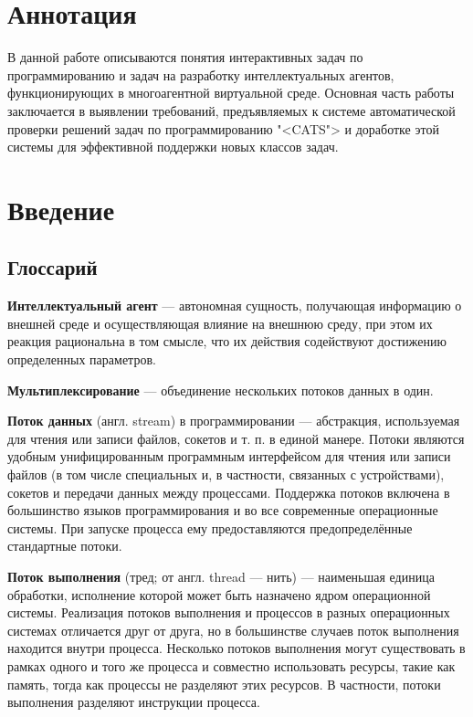 \documentclass{imcs}
\begin{document}
\setcounter{page}{2}
\setcounter{tocdepth}{2}
\tableofcontents
\pagebreak

\section*{Аннотация}
В данной работе описываются понятия интерактивных задач по программированию и задач на разработку интеллектуальных агентов, функционирующих в многоагентной виртуальной среде. Основная часть работы заключается в выявлении требований, предъявляемых к системе автоматической проверки решений задач по программированию "<CATS"> и доработке этой системы для эффективной поддержки новых классов задач.

\pagebreak

\section{Введение}
\subsection{Глоссарий}
\textbf{Интеллектуальный агент} — автономная сущность, получающая информацию о внешней среде и осуществляющая влияние на внешнюю среду, при этом их реакция рациональна в том смысле, что их действия содействуют достижению определенных параметров.

\textbf{Мультиплексирование} — объединение нескольких потоков данных в один.

\textbf{Поток данных} (англ. stream) в программировании — абстракция, используемая для чтения или записи файлов, сокетов и т. п. в единой манере. Потоки являются удобным унифицированным программным интерфейсом для чтения или записи файлов (в том числе специальных и, в частности, связанных с устройствами), сокетов и передачи данных между процессами. Поддержка потоков включена в большинство языков программирования и во все современные операционные системы. При запуске процесса ему предоставляются предопределённые стандартные потоки.

\textbf{Поток выполнения} (тред; от англ. thread — нить) — наименьшая единица обработки, исполнение которой может быть назначено ядром операционной системы. Реализация потоков выполнения и процессов в разных операционных системах отличается друг от друга, но в большинстве случаев поток выполнения находится внутри процесса. Несколько потоков выполнения могут существовать в рамках одного и того же процесса и совместно использовать ресурсы, такие как память, тогда как процессы не разделяют этих ресурсов. В частности, потоки выполнения разделяют инструкции процесса.
\end{document}
